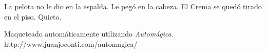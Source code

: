 \documentclass[11pt,twoside,openright]{book}
\begin{document}
 La pelota no le dio en la espalda. Le pegó en la cabeza. El Crema se quedó
 tirado en el piso. Quieto.


\cleardoublepage

%

\hspace{0pt}
\vfill
\begin{center}
Maqueteado automáticamente utilizando \emph{Automágica}.
\bigbreak
http://www.juanjoconti.com/automagica/
\end{center}
\vfill
\hspace{0pt}
\end{document}
